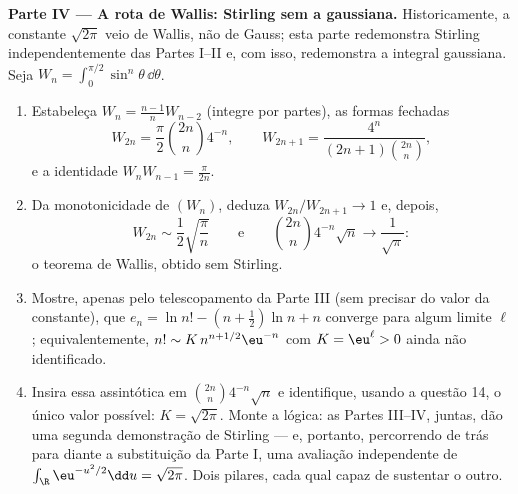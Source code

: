 \begin{problem}
\medskip
\noindent\textbf{Parte IV --- A rota de Wallis: Stirling sem a
gaussiana.} Historicamente, a constante $\sqrt{2\pi}$ veio de Wallis, não de
Gauss; esta parte redemonstra Stirling independentemente das Partes
I--II e, com isso, redemonstra a integral gaussiana. Seja $W_n = \int_0^{\pi/2}\sin^n\theta\,
\dd\theta$.
\begin{enumerate}[resume]
  \item Estabeleça $W_n = \frac{n-1}nW_{n-2}$ (integre por partes), as formas fechadas
        \[
        W_{2n} = \frac\pi2\binom{2n}n4^{-n}, \qquad
        W_{2n+1} = \frac{4^n}{(2n+1)\binom{2n}n},
        \]
        e a identidade $W_nW_{n-1} = \frac\pi{2n}$.
  \item Da monotonicidade de $(W_n)$, deduza $W_{2n}/W_{2n+1} \to 1$ e, depois,
        \[
        W_{2n} \sim \frac12\sqrt{\frac\pi n}
        \qquad\text{e}\qquad
        \binom{2n}n4^{-n}\sqrt n \longrightarrow
        \frac1{\sqrt\pi} :
        \]
        o teorema de Wallis, obtido sem Stirling.
  \item Mostre, apenas pelo telescopamento da Parte III (sem precisar
        do valor da constante), que $e_n = \ln n! - (n +
        \frac12)\ln n + n$ converge para algum limite
        $\ell$; equivalentemente, $n! \sim K\,n^{n+1/2}\eu^{-n}$ com $K =
        \eu^\ell > 0$ ainda não
        identificado.
  \item Insira essa assintótica em $\binom{2n}n4^{-n}\sqrt n$ e identifique, usando a questão
        14, o único valor possível: $K = \sqrt{2\pi}$. Monte a lógica: as Partes
        III--IV, juntas, dão uma segunda demonstração  de
        Stirling --- e, portanto, percorrendo de trás para diante a
        substituição da Parte I, uma avaliação independente de $\int_\R\eu^{-u^2/2}\dd u = \sqrt{2\pi}$.
        Dois pilares, cada qual capaz de sustentar o outro.
\end{enumerate}


\end{problem}
